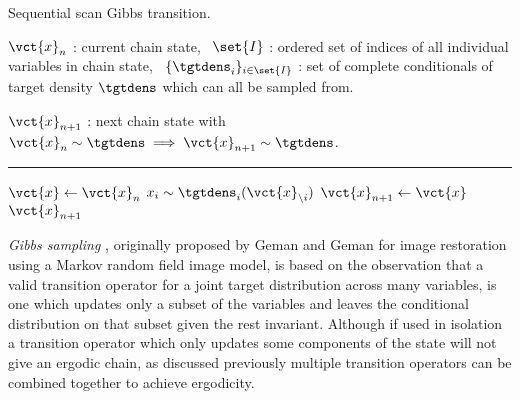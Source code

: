 \begin{algorithm}[!t]
\caption{Sequential scan Gibbs transition.}
\label{alg:gibbs-sampling}
\begin{algorithmic}
\small
    \Require
    $\vct{x}_n$ : current chain state,~
    $\set{I}$ : ordered set of indices of all individual variables in chain state,~
    $\lbrace \tgtdens_{i} \rbrace_{i\in\set{I}}$ : set of complete conditionals of target density $\tgtdens$ which can all be sampled from.
    \Ensure\raggedright
    $\vct{x}_{n+1}$ : next chain state with $\vct{x}_n \sim \tgtdens \implies \vct{x}_{n+1} \sim \tgtdens$.
\end{algorithmic}
\hrule
\small
\begin{algorithmic}[1]
  \State $\vct{x} \gets \vct{x}_n$
    \State $x_i \sim \tgtdens_{i}(\vct{x}_{\backslash i})$ 
  \EndFor
  \State $\vct{x}_{n+1} \gets \vct{x}$
  \State \Return $\vct{x}_{n+1}$
\end{algorithmic}
\end{algorithm}

\emph{Gibbs sampling} \citep{geman1984stochastic,gelfand1990sampling}, originally proposed by Geman and Geman for image restoration using a Markov random field image model, is based on the observation that a valid transition operator for a joint target distribution across many variables, is one which updates only a subset of the variables and leaves the conditional distribution on that subset given the rest invariant. Although if used in isolation a transition operator which only updates some components of the state will not give an ergodic chain, as discussed previously multiple transition operators can be combined together to achieve ergodicity. 

